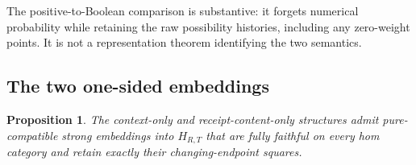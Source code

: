 \documentclass[11pt,a4paper]{article}
\newtheorem{proposition}[theorem]{Proposition}
\theoremstyle{definition}
\begin{document}
The positive-to-Boolean comparison is substantive: it forgets numerical
probability while retaining the raw possibility histories, including any
zero-weight points. It is not a representation theorem identifying the
two semantics.

\subsection{The two one-sided embeddings}\label{pc:one-sided}

\begin{proposition}\label{pc:one-sided-prop}
The context-only and receipt-content-only structures admit pure-compatible
strong embeddings into $H_{R,T}$ that are fully faithful on every hom
category and retain exactly their changing-endpoint squares.
\end{proposition}
\end{document}
